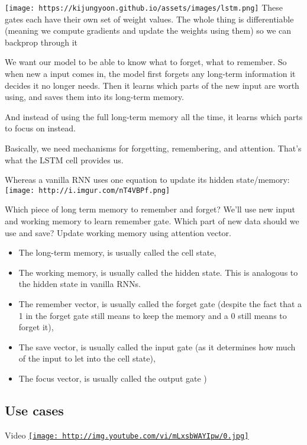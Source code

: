 \documentclass[11pt]{article}
\makeatletter
\def\maxwidth{\ifdim\Gin@nat@width>\linewidth\linewidth
    \else\Gin@nat@width\fi}
\let\Oldincludegraphics\includegraphics
\renewcommand{\includegraphics}[1]{\Oldincludegraphics[width=.8\maxwidth]{#1}}
\providecommand{\tightlist}{%
      \setlength{\itemsep}{0pt}\setlength{\parskip}{0pt}}
\makeatother
\begin{document}
\texttt{[image: https://kijungyoon.github.io/assets/images/lstm.png]}
These gates each have their own set of weight values. The whole thing is
differentiable (meaning we compute gradients and update the weights
using them) so we can backprop through it

We want our model to be able to know what to forget, what to remember.
So when new a input comes in, the model first forgets any long-term
information it decides it no longer needs. Then it learns which parts of
the new input are worth using, and saves them into its long-term memory.

And instead of using the full long-term memory all the time, it learns
which parts to focus on instead.

Basically, we need mechanisms for forgetting, remembering, and
attention. That's what the LSTM cell provides us.

Whereas a vanilla RNN uses one equation to update its hidden
state/memory: \texttt{[image: http://i.imgur.com/nT4VBPf.png]}

Which piece of long term memory to remember and forget? We'll use new
input and working memory to learn remember gate. Which part of new data
should we use and save? Update working memory using attention vector.

\begin{itemize}
\tightlist
\item
  The long-term memory, is usually called the cell state,
\item
  The working memory, is usually called the hidden state. This is
  analogous to the hidden state in vanilla RNNs.
\item
  The remember vector, is usually called the forget gate (despite the
  fact that a 1 in the forget gate still means to keep the memory and a
  0 still means to forget it),
\item
  The save vector, is usually called the input gate (as it determines
  how much of the input to let into the cell state),
\item
  The focus vector, is usually called the output gate )
\end{itemize}

\hypertarget{use-cases}{%
\subsection{Use cases}\label{use-cases}}

Video
\href{https://www.youtube.com/watch?time_continue=14\&v=mLxsbWAYIpw}{\texttt{[image: http://img.youtube.com/vi/mLxsbWAYIpw/0.jpg]}}
\end{document}
